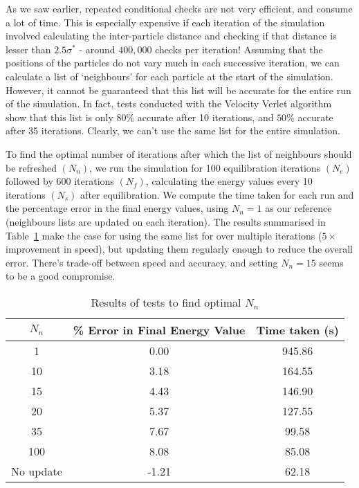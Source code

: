 \documentclass[../Main.tex]{subfiles}
\begin{document}
As we saw earlier, repeated conditional checks are not very efficient, and consume a lot of time. This is especially expensive if each iteration of the simulation involved calculating the inter-particle distance and checking if that distance is lesser than $2.5 \sigma^{*}$ - around $400,000$ checks per iteration! Assuming that the positions of the particles do not vary much in each successive iteration, we can calculate a list of `neighbours' for each particle at the start of the simulation. However, it cannot be guaranteed that this list will be accurate for the entire run of the simulation. In fact, tests conducted with the Velocity Verlet algorithm show that this list is only $80\%$ accurate after 10 iterations, and $50\%$ accurate after 35 iterations. Clearly, we can't use the same list for the entire simulation.

To find the optimal number of iterations after which the list of neighbours should be refreshed $\left(N_{n}\right)$, we run the simulation for 100 equilibration iterations $\left(N_{e}\right)$ followed by 600 iterations $\left(N_{f}\right)$, calculating the energy values every 10 iterations $\left(N_{s}\right)$ after equilibration. We compute the time taken for each run and the percentage error in the final energy values, using $N_{n} = 1$ as our reference (neighbours lists are updated on each iteration). The results summarised in Table~\ref{tbl:results_neighbour_lists} make the case for using the same list for over multiple iterations ($5\times$ improvement in speed), but updating them regularly enough to reduce the overall error. There's trade-off between speed and accuracy, and setting $N_{n} = 15$ seems to be a good compromise. 

\begin{table}[h]
	\centering
	\begin{tabular}{ |c|c|c| }
		\hline
		$N_{n}$ & \% Error in Final Energy Value & Time taken (s) \\
		\hline
		1 & 0.00 &  945.86 \\ 
		10 & 3.18 & 164.55 \\
		15 & 4.43 & 146.90 \\
		20 & 5.37 & 127.55 \\
		35 & 7.67 & 99.58 \\
		100 & 8.08 & 85.08 \\
		No update & -1.21 & 62.18 \\
		\hline
	\end{tabular}
	\caption{Results of tests to find optimal $N_{n}$}
	\label{tbl:results_neighbour_lists}
\end{table}
\end{document}
